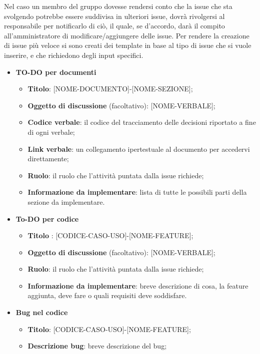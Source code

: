 Nel caso un membro del gruppo dovesse rendersi conto che la issue che sta
svolgendo potrebbe essere suddivisa in ulteriori issue, dovrà rivolgersi al
responsabile per notificarlo di ciò, il quale, se d'accordo, darà il compito
all'amministratore di modificare/aggiungere delle issue. Per rendere la
creazione di issue più veloce si sono creati dei template in base al tipo di
issue che si vuole inserire, e che richiedono degli input specifici.
\begin{itemize}
    \item  \textbf{TO-DO per documenti}
          \begin{itemize}
              \item \textbf{Titolo}: [NOME-DOCUMENTO]-[NOME-SEZIONE];
              \item \textbf{Oggetto di discussione} (facoltativo): [NOME-VERBALE];
              \item \textbf{Codice verbale}: il codice del tracciamento delle decisioni riportato a fine di ogni verbale;
              \item \textbf{Link verbale}: un collegamento ipertestuale al documento per accedervi direttamente;
              \item \textbf{Ruolo}: il ruolo che l'attività puntata dalla issue richiede;
              \item \textbf{Informazione da implementare}: lista di tutte le possibili parti della sezione da implementare.
          \end{itemize}
    \item  \textbf{To-DO per codice}
          \begin{itemize}
              \item \textbf{Titolo} : [CODICE-CASO-USO]-[NOME-FEATURE];
              \item \textbf{Oggetto di discussione} (facoltativo): [NOME-VERBALE];
              \item \textbf{Ruolo}: il ruolo che l'attività puntata dalla issue richiede;
              \item \textbf{Informazione da implementare}: breve descrizione di cosa, la feature aggiunta, deve fare o quali requisiti deve soddisfare.
          \end{itemize}
    \item  \textbf{Bug nel codice}
          \begin{itemize}
              \item \textbf{Titolo}: [CODICE-CASO-USO]-[NOME-FEATURE];
              \item \textbf{Descrizione bug}: breve descrizione del bug;

\end{itemize}
\end{itemize}
